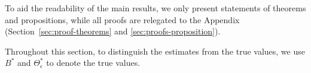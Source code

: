 To aid the readability of the main results, we only present statements of theorems and propositions, while all proofs are relegated to the Appendix (Section~\ref{sec:proof-theorems} and \ref{sec:proofs-proposition}).

Throughout this section, to distinguish the estimates from the true values, we use $B^*$ and $\Theta_\epsilon^*$ to denote the true values. 










